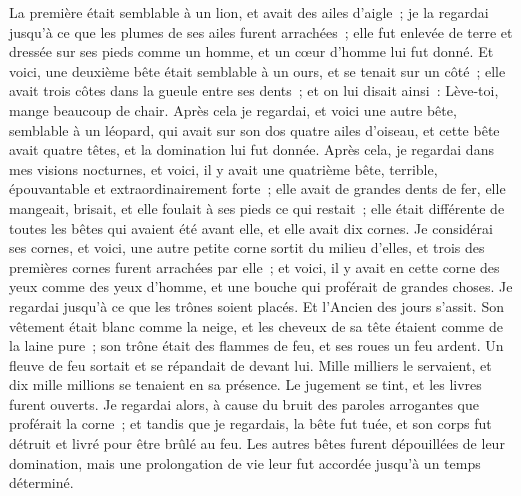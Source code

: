 \begin{multicols}{2}
La première était semblable à un lion, et avait des ailes d'aigle~; je la regardai jusqu'à ce que les plumes de ses ailes furent arrachées~; elle fut enlevée de terre et dressée sur ses pieds comme un homme, et un cœur d'homme lui fut donné.
Et voici, une deuxième bête était semblable à un ours, et se tenait sur un côté~; elle avait trois côtes dans la gueule entre ses dents~; et on lui disait ainsi~: Lève-toi, mange beaucoup de chair.
Après cela je regardai, et voici une autre bête, semblable à un léopard, qui avait sur son dos quatre ailes d'oiseau, et cette bête avait quatre têtes, et la domination lui fut donnée.
Après cela, je regardai dans mes visions nocturnes, et voici, il y avait une quatrième bête, terrible, épouvantable et extraordinairement forte~; elle avait de grandes dents de fer, elle mangeait, brisait, et elle foulait à ses pieds ce qui restait~; elle était différente de toutes les bêtes qui avaient été avant elle, et elle avait dix cornes.
Je considérai ses cornes, et voici, une autre petite corne sortit du milieu d'elles, et trois des premières cornes furent arrachées par elle~; et voici, il y avait en cette corne des yeux comme des yeux d'homme, et une bouche qui proférait de grandes choses.
Je regardai jusqu'à ce que les trônes soient placés. Et l'Ancien des jours s'assit. Son vêtement était blanc comme la neige, et les cheveux de sa tête étaient comme de la laine pure~; son trône était des flammes de feu, et ses roues un feu ardent.
Un fleuve de feu sortait et se répandait de devant lui. Mille milliers le servaient, et dix mille millions se tenaient en sa présence. Le jugement se tint, et les livres furent ouverts.
Je regardai alors, à cause du bruit des paroles arrogantes que proférait la corne~; et tandis que je regardais, la bête fut tuée, et son corps fut détruit et livré pour être brûlé au feu.
Les autres bêtes furent dépouillées de leur domination, mais une prolongation de vie leur fut accordée jusqu'à un temps déterminé.

\end{multicols}
